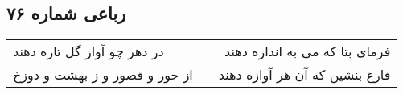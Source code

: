 \begin{center}
\section*{رباعی شماره ۷۶}
\label{sec:sh076}
\begin{longtable}{l p{0.5cm} r}
در دهر چو آواز گل تازه دهند
&&
فرمای بتا که می به اندازه دهند
\\
از حور و قصور و ز بهشت و دوزخ
&&
فارغ بنشین که آن هر آوازه دهند
\\
\end{longtable}
\end{center}
